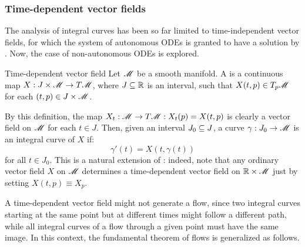 \subsubsection{Time-dependent vector fields}

The analysis of integral curves has been so far limited to time-independent vector fields, for which the system of autonomous ODEs  is granted to have a solution by . Now, the case of non-autonomous ODEs is explored.

\begin{definition}{Time-dependent vector field}{}
  Let $ \mathscr{M} $ be a smooth manifold. A  is a continuous map $ X : J \times \mathscr{M} \rightarrow T\mathscr{M} $, where $ J \subseteq \mathbb{R} $ is an interval, such that $ X(t,p) \in T_p\mathscr{M} $ for each $ (t,p) \in J \times \mathscr{M} $.
\end{definition}

By this definition, the map $ X_t : \mathscr{M} \rightarrow T\mathscr{M} : X_t(p) = X(t,p) $ is clearly a vector field on $ \mathscr{M} $ for each $ t \in J $. Then, given an interval $ J_0 \subseteq J $, a curve $ \gamma : J_0 \rightarrow \mathscr{M} $ is an integral curve of $ X $ if:
\begin{equation}
  \gamma'(t) = X(t, \gamma(t))
\end{equation}
for all $ t \in J_0 $. This is a natural extension of : indeed, note that any ordinary vector field $ X $ on $ \mathscr{M} $ determines a time-dependent vector field on $ \mathbb{R} \times \mathscr{M} $ just by setting $ X(t,p) \equiv X_p $.

A time-dependent vector field might not generate a flow, since two integral curves starting at the same point but at different times might follow a different path, while all integral curves of a flow through a given point must have the same image. In this context, the fundamental theorem of flows  is generalized as follows.

